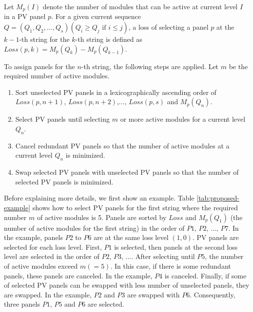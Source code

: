 \documentclass[conference]{pvsctran}
\begin{document}
Let $M_{p}(I)$ denote the number of modules that can be active at current level $I$ in a PV panel $p$. 
For a given current sequence $Q = (Q_{1},Q_{2},\ldots ,Q_{s}) (Q_{i} \geq Q_{j} \mbox{\ if\ } i \leq j)$, 
a loss of selecting a panel $p$ at the $k-1$-th string for the $k$-th string is defined as 
$Loss(p,k) = M_{p}(Q_{k}) - M_{p}(Q_{k-1})$. 

To assign panels for the $n$-th string, the following steps are applied. Let $m$ be the required number of active modules.
\begin{enumerate}
\item Sort unselected PV panels in a lexicographically ascending order of $Loss(p,n+1)$, $Loss(p,n+2)$,$\ldots$, $Loss(p,s)$ and $M_{p}(Q_{n})$.
\item Select PV panels until selecting $m$ or more active modules for a current level $Q_{n}$.
\item Cancel redundant PV panels so that the number of active modules at a current level $Q_{n}$ is minimized.
\item Swap selected PV panels with unselected PV panels so that the number of selected PV panels is minimized.
\end{enumerate}

Before explaining more details, we first show an example.
Table \ref{tab:proposed-example} shows how to select PV panels for the first string where the required number $m$ of active modules is 5. 
Panels are sorted by $Loss$ and $M_{p}(Q_{1})$ (the number of active modules for the first string) in the order of $P1$, $P2$, $\ldots$, $P7$. 
In the example, panels $P2$ to $P6$ are at the same loss level $(1,0)$. 
PV panels are selected for each loss level. First, $P1$ is selected, then panels at the second loss level are selected in the order of $P2$, $P3$, $\ldots$. After selecting until $P5$, the number of active modules exceed $m (=5)$. In this case, if there is some redundant panels, these panels are canceled. In the example, $P4$ is canceled. Finally, if some of selected PV panels can be swapped with less number of unselected panels, they are swapped. In the example, $P2$ and $P3$ are swapped with $P6$. Consequently, three panels $P1$, $P5$ and $P6$ are selected. 
\end{document}
